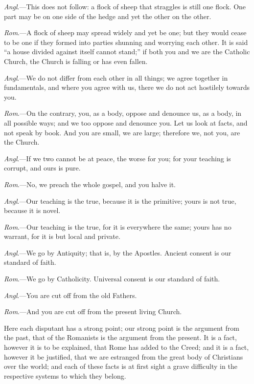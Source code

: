 \emph{Angl}.—This does not follow: a flock of
sheep that straggles is still one flock. One part may be on one side
of the hedge and yet the other on the other.

\emph{Rom}.—A flock of sheep may spread widely
and yet be one; but they would cease to be one if they formed into
parties shunning and worrying each other. It is said ``a house divided
against itself cannot stand;'' if both you and we are the Catholic
Church, the Church is falling or has even fallen.

\emph{Angl}.—We do not differ from each other
in all things; we agree together in fundamentals, and where you agree
with us, there we do not act hostilely towards you.

\emph{Rom}.—On the contrary, you, as a body,
oppose and denounce us, as a body, in all possible ways; and we too
oppose and denounce you. Let us look at facts, and not speak by
book. And you are small, we are large; therefore we, not you, are the
Church.

\emph{Angl}.—If we two cannot be at peace, the
worse for you; for your teaching is corrupt, and ours is pure.

\emph{Rom}.—No, we preach the whole gospel, and
you halve it.

\emph{Angl}.—Our teaching is the true, because
it is the primitive; yours is not true, because it is novel.

\emph{Rom}.—Our teaching is the true, for it is
everywhere the same; yours has no warrant, for it is but local and
private.

\emph{Angl}.—We go by Antiquity; that is, by
the Apostles. Ancient consent is our standard of faith.

\emph{Rom}.—We go by Catholicity. Universal
consent is our standard of faith.

\emph{Angl}.—You are cut off from the old
Fathers.

\emph{Rom}.—And you are cut off from the
present living Church.

Here each disputant has a strong point; our
strong point is the argument from the past, that of the Romanists is
the argument from the present. It is a fact, however it is to be
explained, that Rome has added to the Creed; and it is a fact, however
it be justified, that we are estranged from the great body of
Christians over the world; and each of these facts is at first sight a
grave difficulty in the respective systems to which they belong.

